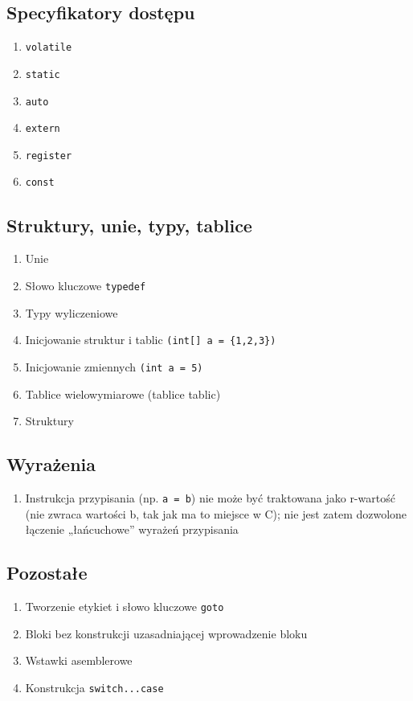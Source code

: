 \documentclass[a4paper,twoside,openright,11pt]{report}
\begin{document}
  \subsection {Specyfikatory dostępu}
    \begin{enumerate}
      \item \texttt{volatile}
      \item \texttt{static}
      \item \texttt{auto}
      \item \texttt{extern}
      \item \texttt{register}
      \item \texttt{const}
    \end{enumerate}
  \subsection {Struktury, unie, typy, tablice}
    \begin{enumerate}
      \item Unie
      \item Słowo kluczowe \texttt{typedef}
      \item Typy wyliczeniowe
      \item Inicjowanie struktur i tablic \texttt{(int[] a = \{1,2,3\})}
      \item Inicjowanie zmiennych \texttt{(int a = 5)}
      \item Tablice wielowymiarowe (tablice tablic) 
      \item Struktury
    \end{enumerate}
  \subsection {Wyrażenia}
    \begin{enumerate}
      \item Instrukcja przypisania (np. \texttt{a = b}) nie może być traktowana jako r-wartość (nie zwraca wartości b, tak jak ma to miejsce w C); nie jest zatem dozwolone łączenie „łańcuchowe” wyrażeń przypisania
    \end{enumerate}
  \subsection {Pozostałe}
    \begin{enumerate}
      \item Tworzenie etykiet i słowo kluczowe \texttt{goto}
      \item Bloki bez konstrukcji uzasadniającej wprowadzenie bloku
      \item Wstawki asemblerowe
      \item Konstrukcja \texttt{switch...case}
    \end{enumerate}
\end{document}
